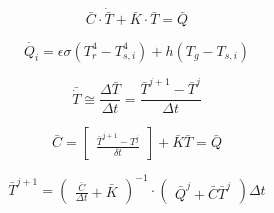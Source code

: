 \begin{equation}
    \bar{C} \cdot \dot{\bar{T}} + \bar{K} \cdot \bar{T} = \bar{Q}
\end{equation}

\begin{equation}
    \dot{Q_i} = 
    \epsilon \sigma (T^4_r - T^4_{s,i}) + h(T_g - T_{s,i})
\end{equation}

\begin{equation}
    \bar{\dot{T}} \cong \frac{\Delta\bar{T}}{\Delta t} = 
    \frac{\bar{T}^{j+1} - \bar{T}^j}{\Delta t}
\end{equation}

\begin{equation}
    \bar{C} = 
    \begin{bmatrix}
        \frac{\bar{T}^{j+1} - T^j}{\delta t}
    \end{bmatrix}
    + \bar{K}\bar{T} = \bar{Q}
\end{equation}

\begin{equation}
    \bar{T}^{j+1} = 
    \begin{pmatrix}
    \frac{\bar{C}}{\Delta t} + \bar{K}
    \end{pmatrix}^{-1}
    \cdot
    \begin{pmatrix}
    \bar{Q}^j + \bar{C}\bar{T}^j
    \end{pmatrix} \Delta t
\end{equation}